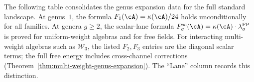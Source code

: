 The following table consolidates the genus expansion data for the
full standard landscape. At genus~$1$, the formula
$F_1(\cA)=\kappa(\cA)/24$ holds unconditionally for all families. At
genera $g \geq 2$, the scalar-lane formula
$F_g^{\mathrm{sc}}(\cA)
=\kappa(\cA) \cdot \lambda_g^{\mathrm{FP}}$ is proved for
uniform-weight algebras and for free fields. For interacting
multi-weight algebras such as $\mathcal{W}_3$, the listed
$F_2,F_3$ entries are the diagonal scalar terms; the full free
energy includes cross-channel corrections
(Theorem~\ref{thm:multi-weight-genus-expansion}).
The ``Lane'' column records this distinction.

\begin{table}[ht]
\centering
\caption{Free energies $F_1$, $F_2$, $F_3$ for the $15$ standard
families\textup{;} $\lambda_1^{\mathrm{FP}} = 1/24$,
$\lambda_2^{\mathrm{FP}} = 7/5760$,
$\lambda_3^{\mathrm{FP}} = 31/967680$}
\label{tab:free-energy-all-genera}
\renewcommand{\arraystretch}{1.5}
{\small
{}}
\end{table}
